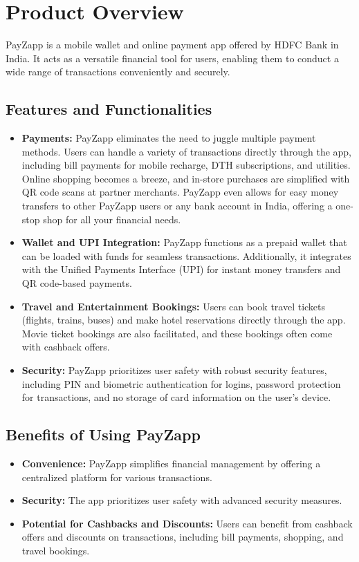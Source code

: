 \documentclass[12pt,a4paper]{report}
\begin{document}
 
\section{Product Overview}
PayZapp is a mobile wallet and online payment app offered by HDFC Bank in India. It acts as a versatile financial tool for users, enabling them to conduct a wide range of transactions conveniently and securely.

\subsection{Features and Functionalities}
\begin{itemize}
    \item \textbf{Payments:} PayZapp eliminates the need to juggle multiple payment methods. Users can handle a variety of transactions directly through the app, including bill payments for mobile recharge, DTH subscriptions, and utilities. Online shopping becomes a breeze, and in-store purchases are simplified with QR code scans at partner merchants. PayZapp even allows for easy money transfers to other PayZapp users or any bank account in India, offering a one-stop shop for all your financial needs.
    
    \item \textbf{Wallet and UPI Integration:} PayZapp functions as a prepaid wallet that can be loaded with funds for seamless transactions. Additionally, it integrates with the Unified Payments Interface (UPI) for instant money transfers and QR code-based payments.
    
    \item \textbf{Travel and Entertainment Bookings:} Users can book travel tickets (flights, trains, buses) and make hotel reservations directly through the app. Movie ticket bookings are also facilitated, and these bookings often come with cashback offers.
    
    \item \textbf{Security:} PayZapp prioritizes user safety with robust security features, including PIN and biometric authentication for logins, password protection for transactions, and no storage of card information on the user's device.
\end{itemize}

\subsection{Benefits of Using PayZapp}
\begin{itemize}
    \item \textbf{Convenience:} PayZapp simplifies financial management by offering a centralized platform for various transactions.
    \item \textbf{Security:} The app prioritizes user safety with advanced security measures.
    \item \textbf{Potential for Cashbacks and Discounts:} Users can benefit from cashback offers and discounts on transactions, including bill payments, shopping, and travel bookings.
\end{itemize}
\end{document}
